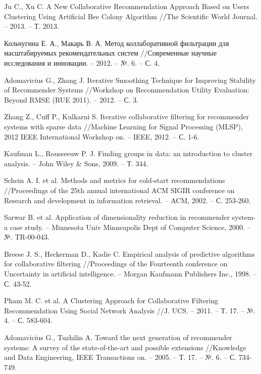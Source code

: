 \documentclass[a4paper, 12pt]{article} %
\begin{document}
\begin{thebibliography}{99}
 Ju C., Xu C. A New Collaborative Recommendation Approach Based on Users Clustering Using Artificial Bee Colony Algorithm //The Scientific World Journal. – 2013. – Т. 2013.

 Кольчугина Е. А., Макарь В. А. Метод коллаборативной фильтрации для масштабируемых рекомендательных систем //Современные научные исследования и инновации. – 2012. – №. 6. – С. 4.

 Adomavicius G., Zhang J. Iterative Smoothing Technique for Improving Stability of Recommender Systems //Workshop on Recommendation Utility Evaluation: Beyond RMSE (RUE 2011). – 2012. – С. 3.

 Zhang Z., Cuff P., Kulkarni S. Iterative collaborative filtering for recommender systems with sparse data //Machine Learning for Signal Processing (MLSP), 2012 IEEE International Workshop on. – IEEE, 2012. – С. 1-6.

 Kaufman L., Rousseeuw P. J. Finding groups in data: an introduction to cluster analysis. – John Wiley \& Sons, 2009. – Т. 344.

 Schein A. I. et al. Methods and metrics for cold-start recommendations //Proceedings of the 25th annual international ACM SIGIR conference on Research and development in information retrieval. – ACM, 2002. – С. 253-260.

 Sarwar B. et al. Application of dimensionality reduction in recommender system-a case study. – Minnesota Univ Minneapolis Dept of Computer Science, 2000. – №. TR-00-043.

 Breese J. S., Heckerman D., Kadie C. Empirical analysis of predictive algorithms for collaborative filtering //Proceedings of the Fourteenth conference on Uncertainty in artificial intelligence. – Morgan Kaufmann Publishers Inc., 1998. – С. 43-52.


 Pham M. C. et al. A Clustering Approach for Collaborative Filtering Recommendation Using Social Network Analysis //J. UCS. – 2011. – Т. 17. – №. 4. – С. 583-604.

 Adomavicius G., Tuzhilin A. Toward the next generation of recommender systems: A survey of the state-of-the-art and possible extensions //Knowledge and Data Engineering, IEEE Transactions on. – 2005. – Т. 17. – №. 6. – С. 734-749.


\end{thebibliography}
\end{document}
